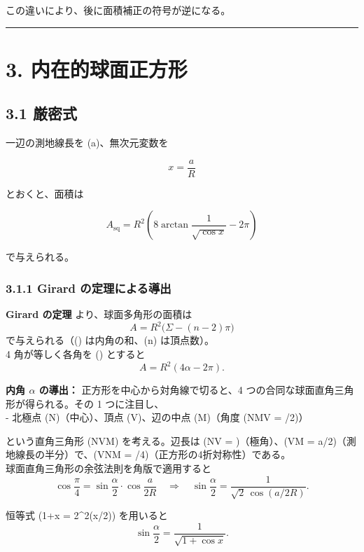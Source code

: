 \documentclass[
  12pt,
  a4paper,
]{article}
\begin{document}
この違いにより、後に面積補正の符号が逆になる。

\begin{center}\rule{0.5\linewidth}{0.5pt}\end{center}

\section{3.
内在的球面正方形}\label{ux5185ux5728ux7684ux7403ux9762ux6b63ux65b9ux5f62-1}

\subsection{3.1 厳密式}\label{ux53b3ux5bc6ux5f0f}

一辺の測地線長を (a)、無次元変数を

\[
x=\frac{a}{R}
\]

とおくと、面積は

\[
\boxed{
A_{\mathrm{sq}} =
R^2\left(
8\arctan\frac{1}{\sqrt{\cos x}}-2\pi
\right)
}
\]

で与えられる。

\subsubsection{3.1.1 Girard
の定理による導出}\label{girard-ux306eux5b9aux7406ux306bux3088ux308bux5c0eux51fa}

\textbf{Girard の定理} より、球面多角形の面積は \[
A = R^2\bigl(\Sigma - (n-2)\pi\bigr)
\] で与えられる（(\Sigma) は内角の和、(n) は頂点数）。\\
4 角が等しく各角を (\alpha) とすると \[
A = R^2(4\alpha - 2\pi).
\]

\textbf{内角 \(\alpha\) の導出：} 正方形を中心から対角線で切ると、4
つの合同な球面直角三角形が得られる。その 1 つに注目し、\\
- 北極点 (N)（中心）、頂点 (V)、辺の中点 (M)（角度 (\angle NMV =
\pi/2)）

という直角三角形 (NVM) を考える。辺長は (NV = \rho)（極角）、(VM =
a/2)（測地線長の半分）で、(\angle VNM =
\pi/4)（正方形の4折対称性）である。\\
球面直角三角形の余弦法則を角版で適用すると \[
\cos\frac{\pi}{4} = \sin\frac{\alpha}{2}\cdot\cos\frac{a}{2R}
\quad\Longrightarrow\quad
\sin\frac{\alpha}{2} = \frac{1}{\sqrt{2}\,\cos(a/2R)}.
\]

恒等式 (1+\cos x = 2\cos\^{}2(x/2)) を用いると \[
\sin\frac{\alpha}{2} = \frac{1}{\sqrt{1+\cos x}}.
\]
\end{document}
